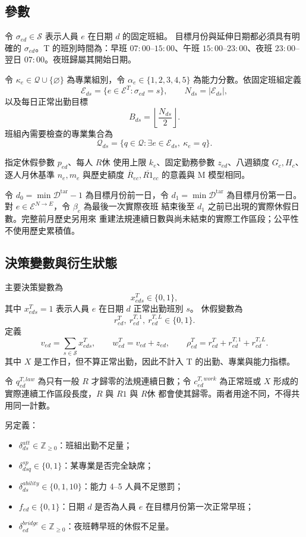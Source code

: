 \documentclass[a4paper,12pt]{article}
\begin{document}
\subsection{參數}

令 \(\sigma_{ed}\in\mathcal{S}\) 表示人員 \(e\) 在日期 \(d\) 的固定班組。
目標月份與延伸日期都必須具有明確的 \(\sigma_{ed}\)。T 的班別時間為：早班
\(07{:}00\)--\(15{:}00\)、午班 \(15{:}00\)--\(23{:}00\)、夜班
\(23{:}00\)--翌日 \(07{:}00\)。夜班歸屬其開始日期。

令 \(\kappa_e\in\mathcal{Q}\cup\{\varnothing\}\) 為專業組別，令
\(\alpha_e\in\{1,2,3,4,5\}\) 為能力分數。依固定班組定義
\[
  \mathcal{E}_{ds}
  =
  \{e\in\mathcal{E}^{T}:\sigma_{ed}=s\},
  \qquad
  N_{ds}=|\mathcal{E}_{ds}|,
\]
以及每日正常出勤目標
\[
  B_{ds}=\left\lfloor\frac{N_{ds}}{2}\right\rfloor.
\]
班組內需要檢查的專業集合為
\[
  \mathcal{Q}_{ds}
  =
  \{q\in\mathcal{Q}:\exists e\in\mathcal{E}_{ds},\ \kappa_e=q\}.
\]

指定休假參數 \(p_{ed}\)、每人 \(R休\) 使用上限 \(k_e\)、固定勤務參數 \(z_{ed}\)、八週額度
\(G_c,H_c\)、逐人月休基準 \(n_e,m_e\) 與歷史額度
\(\overline{R}_{ec},\overline{R1}_{ec}\) 的意義與 M 模型相同。

令 \(d_0=\min\mathcal{D}^{\mathrm{tar}}-1\) 為目標月份前一日，令
\(d_1=\min\mathcal{D}^{\mathrm{tar}}\) 為目標月份第一日。對
\(e\in\mathcal{E}^{N\rightarrow E}\)，令 \(\beta_e\) 為最後一次實際夜班
結束後至 \(d_1\) 之前已出現的實際休假日數。完整前月歷史另用來
重建法規連續日數與尚未結束的實際工作區段；公平性不使用歷史累積值。

\subsection{決策變數與衍生狀態}

主要決策變數為
\[
  x^{T}_{eds}\in\{0,1\},
\]
其中 \(x^{T}_{eds}=1\) 表示人員 \(e\) 在日期 \(d\) 正常出勤班別 \(s\)。
休假變數為
\[
  r^{T}_{ed},\ r^{T,1}_{ed},\ r^{T,L}_{ed}\in\{0,1\}.
\]
定義
\[
  v_{ed}=\sum_{s\in\mathcal{S}}x^{T}_{eds},
  \qquad
  w^{T}_{ed}=v_{ed}+z_{ed},
  \qquad
  \rho^{T}_{ed}=r^{T}_{ed}+r^{T,1}_{ed}+r^{T,L}_{ed}.
\]
其中 \(X\) 是工作日，但不算正常出勤，因此不計入 T 的出勤、專業與能力指標。

令 \(q^{T,law}_{ed}\) 為只有一般 \(R\) 才歸零的法規連續日數；令
\(c^{T,work}_{ed}\) 為正常班或 \(X\) 形成的實際連續工作區段長度，\(R\) 與
\(R1\) 與 \(R休\) 都會使其歸零。兩者用途不同，不得共用同一計數。

另定義：
\begin{itemize}
  \item \(\delta^{att}_{ds}\in\mathbb{Z}_{\geq0}\)：班組出勤不足量；
  \item \(\delta^{sp}_{dsq}\in\{0,1\}\)：某專業是否完全缺席；
  \item \(\delta^{ability}_{ds}\in\{0,1,10\}\)：能力 4--5 人員不足懲罰；
  \item \(f_{ed}\in\{0,1\}\)：日期 \(d\) 是否為人員 \(e\) 在目標月份第一次正常早班；
  \item \(\delta^{bridge}_{ed}\in\mathbb{Z}_{\geq0}\)：夜班轉早班的休假不足量。
\end{itemize}
\end{document}
